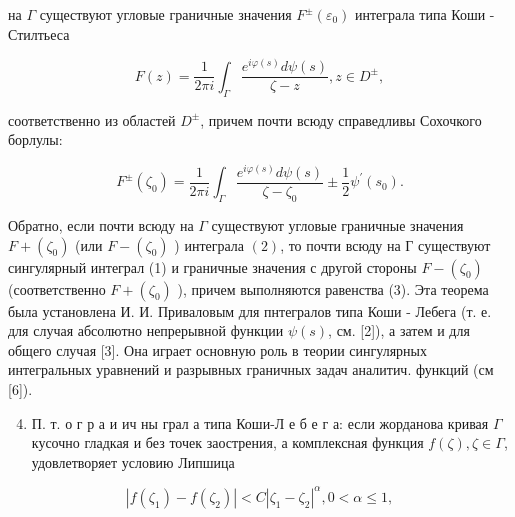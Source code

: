 \documentclass[10pt]{article}
\begin{document}
на $\Gamma$ существуют угловые граничные значения $F^{ \pm}\left(\varepsilon_{0}\right)$ интеграла типа Коши - Стилтьеса



\[

F(z)=\frac{1}{2 \pi i} \int_{\Gamma} \frac{e^{i \varphi(s)} d \psi(s)}{\zeta-z}, z \in D^{ \pm},

\]



соответственно из областей $D^{ \pm}$, причем почти всюду справедливы Сохочкого борлулы:



\[

F^{ \pm}\left(\zeta_{0}\right)=\frac{1}{2 \pi i} \int_{\Gamma} \frac{e^{i \varphi(s)} d \psi(s)}{\zeta-\zeta_{0}} \pm \frac{1}{2} \psi^{\prime}\left(s_{0}\right) .

\]



Обратно, если почти всюду на $\Gamma$ существуют угловые граничные значения $F+\left(\zeta_{0}\right)$ (или $F-\left(\zeta_{0}\right)$ ) интеграла $(2)$, то почти всюду на Г существуют сингулярный интеграл (1) и граничные значения с другой стороны $F-\left(\zeta_{0}\right)$ (соответственно $F+\left(\zeta_{0}\right)$ ), причем выполняются равенства (3). Эта теорема была установлена И. И. Приваловым для пнтегралов типа Коши - Лебега (т. е. для случая абсолютно непрерывной функции $\psi(s)$, см. [2]), а затем и для общего случая [3]. Она играет основную роль в теории сингулярных интегральных уравнений и разрывных граничных задач аналитич. функций (см [6]).



\begin{enumerate}

  \setcounter{enumi}{3}

  \item П. т. о г р а и ич ны грал а типа Коши-Л е б е г а: если жорданова кривая $\Gamma$ кусочно гладкая и без точек заострения, а комплексная функция $f(\zeta), \zeta \in \Gamma$, удовлетворяет условию Липшица

\end{enumerate}



\[

\left|f\left(\zeta_{1}\right)-f\left(\zeta_{2}\right)\right|<C\left|\zeta_{1}-\zeta_{2}\right|^{\alpha}, 0<\alpha \leqslant 1,

\]
\end{document}
